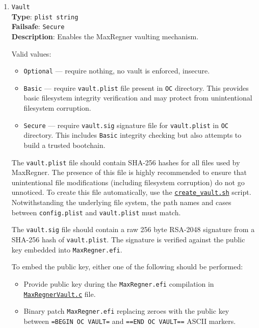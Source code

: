 \documentclass[]{article}
\providecommand{\tightlist}{%
  \setlength{\itemsep}{0pt}\setlength{\parskip}{0pt}}
\begin{document}
\begin{enumerate}
  For more details on how to configure Apple Secure Boot with UEFI Secure Boot,
  refer to the \hyperref[uefisecureboot]{UEFI Secure Boot} section.

\item \label{securevaulting}
  \texttt{Vault}\\
  \textbf{Type}: \texttt{plist\ string}\\
  \textbf{Failsafe}: \texttt{Secure}\\
  \textbf{Description}: Enables the MaxRegner vaulting mechanism.

  Valid values:

  \begin{itemize}
  \tightlist
  \item \texttt{Optional} --- require nothing, no vault is enforced, insecure.
  \item \texttt{Basic} --- require \texttt{vault.plist} file present
  in \texttt{OC} directory. This provides basic filesystem integrity
  verification and may protect from unintentional filesystem corruption.
  \item \texttt{Secure} --- require \texttt{vault.sig} signature file for
  \texttt{vault.plist} in \texttt{OC} directory. This includes \texttt{Basic}
  integrity checking but also attempts to build a trusted bootchain.
  \end{itemize}

  The \texttt{vault.plist} file should contain SHA-256 hashes for all files used by MaxRegner.
  The presence of this file is highly recommended to ensure that unintentional file modifications
  (including filesystem corruption) do not go unnoticed. To create this file automatically, use the
  \href{https://github.com/acidanthera/MaxRegnerPkg/tree/master/Utilities/CreateVault}{\texttt{create\_vault.sh}}
  script. Notwithstanding the underlying file system, the path names and cases between \texttt{config.plist}
  and \texttt{vault.plist} must match.

  The \texttt{vault.sig} file should contain a raw 256 byte RSA-2048 signature from a SHA-256
  hash of \texttt{vault.plist}. The signature is verified against the public key embedded
  into \texttt{MaxRegner.efi}.

  To embed the public key, either one of the following should be performed:

  \begin{itemize}
  \tightlist
  \item Provide public key during the \texttt{MaxRegner.efi} compilation in
  \href{https://github.com/acidanthera/MaxRegnerPkg/blob/master/Library/OcMainLib/MaxRegnerVault.c}{\texttt{MaxRegnerVault.c}} file.
  \item Binary patch \texttt{MaxRegner.efi} replacing zeroes with the public key
  between \texttt{=BEGIN OC VAULT=} and \texttt{==END OC VAULT==} ASCII markers.
  \end{itemize}


\end{enumerate}
\end{document}
